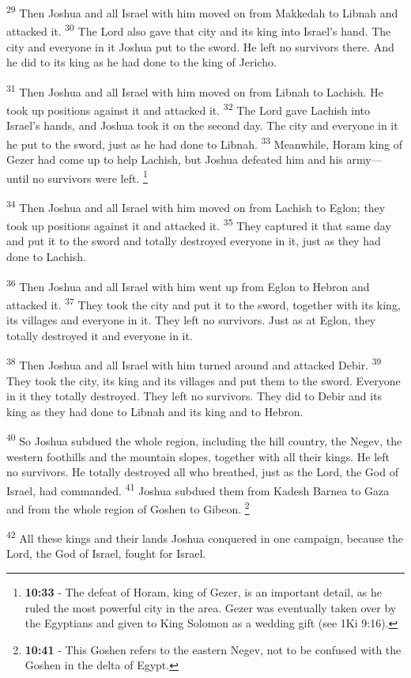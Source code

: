 \documentclass[12pt,twoside]{article}
\newcommand{\vs}[1]{\textsuperscript{#1}}
\newcommand{\vnote}[2]{%
  \begingroup
  \renewcommand\thefootnote{}%
  \footnote{\scriptsize \textbf{}#2}%
  \addtocounter{footnote}{-1}%
  \endgroup
}
\begin{document}
\vs{29} Then Joshua and all Israel with him moved on from Makkedah to Libnah and attacked it.
\vs{30} The Lord also gave that city and its king into Israel's hand. The city and everyone in it Joshua put to the sword. He left no survivors there. And he did to its king as he had done to the king of Jericho.

\vs{31} Then Joshua and all Israel with him moved on from Libnah to Lachish. He took up positions against it and attacked it.
\vs{32} The Lord gave Lachish into Israel's hands, and Joshua took it on the second day. The city and everyone in it he put to the sword, just as he had done to Libnah.
\vs{33} Meanwhile, Horam king of Gezer had come up to help Lachish, but Joshua defeated him and his army---until no survivors were left.\vnote{33}{\textbf{10:33} - The defeat of Horam, king of Gezer, is an important detail, as he ruled the most powerful city in the area. Gezer was
eventually taken over by the Egyptians and given to King Solomon as a wedding gift (see 1Ki 9:16).}

\vs{34} Then Joshua and all Israel with him moved on from Lachish to Eglon; they took up positions against it and attacked it.
\vs{35} They captured it that same day and put it to the sword and totally destroyed everyone in it, just as they had done to Lachish.

\vs{36} Then Joshua and all Israel with him went up from Eglon to Hebron and attacked it.
\vs{37} They took the city and put it to the sword, together with its king, its villages and everyone in it. They left no survivors. Just as at Eglon, they totally destroyed it and everyone in it.

\vs{38} Then Joshua and all Israel with him turned around and attacked Debir.
\vs{39} They took the city, its king and its villages and put them to the sword. Everyone in it they totally destroyed. They left no survivors. They did to Debir and its king as they had done to Libnah and its king and to Hebron.

\vs{40} So Joshua subdued the whole region, including the hill country, the Negev, the western foothills and the mountain slopes, together with all their kings. He left no survivors. He totally destroyed all who breathed, just as the Lord, the God of Israel, had commanded.
\vs{41} Joshua subdued them from Kadesh Barnea to Gaza and from the whole region of Goshen to Gibeon.\vnote{41}{\textbf{10:41} - This Goshen refers to the eastern Negev, not to be confused with the Goshen in the delta of Egypt.}
\vs{42} All these kings and their lands Joshua conquered in one campaign, because the Lord, the God of Israel, fought for Israel.
\end{document}
